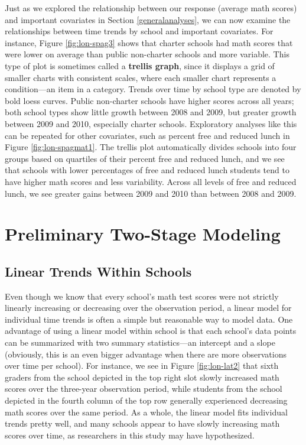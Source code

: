 \documentclass[
]{krantz}
\begin{document}
Just as we explored the relationship between our response (average math scores) and important covariates in Section \ref{generalanalyses}, we can now examine the relationships between time trends by school and important covariates. For instance, Figure \ref{fig:lon-spag3} shows that charter schools had math scores that were lower on average than public non-charter schools and more variable. This type of plot is sometimes called a \textbf{trellis graph},  since it displays a grid of smaller charts with consistent scales, where each smaller chart represents a condition---an item in a category. Trends over time by school type are denoted by bold loess curves. Public non-charter schools have higher scores across all years; both school types show little growth between 2008 and 2009, but greater growth between 2009 and 2010, especially charter schools. Exploratory analyses like this can be repeated for other covariates, such as percent free and reduced lunch in Figure \ref{fig:lon-spagmat1}. The trellis plot automatically divides schools into four groups based on quartiles of their percent free and reduced lunch, and we see that schools with lower percentages of free and reduced lunch students tend to have higher math scores and less variability. Across all levels of free and reduced lunch, we see greater gains between 2009 and 2010 than between 2008 and 2009.

\hypertarget{twostage9}{%
\section{Preliminary Two-Stage Modeling}\label{twostage9}}

\hypertarget{lineartwostage}{%
\subsection{Linear Trends Within Schools}\label{lineartwostage}}

Even though we know that every school's math test scores were not strictly linearly increasing or decreasing over the observation period, a linear model for individual time trends is often a simple but reasonable way to model data. One advantage of using a linear model within school is that each school's data points can be summarized with two summary statistics---an intercept and a slope (obviously, this is an even bigger advantage when there are more observations over time per school). For instance, we see in Figure \ref{fig:lon-lat2} that sixth graders from the school depicted in the top right slot slowly increased math scores over the three-year observation period, while students from the school depicted in the fourth column of the top row generally experienced decreasing math scores over the same period. As a whole, the linear model fits individual trends pretty well, and many schools appear to have slowly increasing math scores over time, as researchers in this study may have hypothesized.
\end{document}
